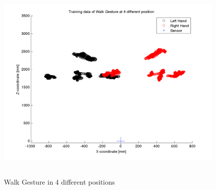 \begin{figure}
	[h] \centering 
	\includegraphics[height=10cm]{figures/result/plot-ges-pos-4.png} \caption{Walk Gesture in 4 different positions} \label{pl:ges:pos} 
\end{figure}
